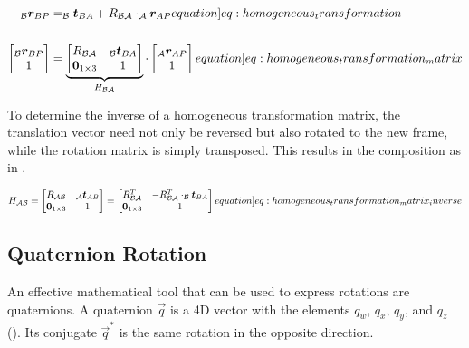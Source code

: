 \begin{align}
    _\mathcal B \vec r_{BP} &= _\mathcal B \vec t_{BA} + R_{\mathcal B \mathcal A} \cdot _\mathcal A \vec r_{AP}
    \label[equation]{eq:homogeneous_transformation}
    \\
    \\
    \begin{bmatrix} _\mathcal B \vec r_{BP} \\ 1 \end{bmatrix} &= \underbrace{\begin{bmatrix} R_{\mathcal B \mathcal A} & _\mathcal B \vec t_{BA} \\ \vec 0_{1\times 3} & 1 \end{bmatrix}}_{H_{\mathcal B \mathcal A}} \cdot \begin{bmatrix} _\mathcal A \vec r_{AP} \\ 1 \end{bmatrix}
    \label[equation]{eq:homogeneous_transformation_matrix}
\end{align}

To determine the inverse of a homogeneous transformation matrix, the translation vector need not only be reversed but also rotated to the new frame, while the rotation matrix is simply transposed. This results in the composition as in .

\begin{equation}
    H_{\mathcal A \mathcal B} = \begin{bmatrix} R_{\mathcal A \mathcal B} & _\mathcal A \vec t_{AB} \\ \vec 0_{1\times 3} & 1 \end{bmatrix}
    = \begin{bmatrix} R_{\mathcal B \mathcal A}^T & -R_{\mathcal B \mathcal A}^T \cdot _\mathcal B \vec t_{BA} \\ \vec 0_{1\times 3} & 1 \end{bmatrix}
    \label[equation]{eq:homogeneous_transformation_matrix_inverse}
\end{equation}

\newpage
\subsection{Quaternion Rotation}

An effective mathematical tool that can be used to express rotations are quaternions. A quaternion $\vec q$ is a 4D vector with the elements $q_w$, $q_x$, $q_y$, and $q_z$ (). Its conjugate $\vec q^*$ is the same rotation in the opposite direction.


